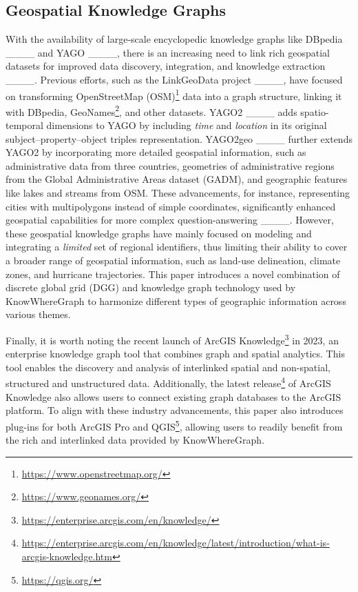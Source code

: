 \subsection{Geospatial Knowledge Graphs}
\label{ssec:gkg}
With the availability of large-scale encyclopedic knowledge graphs like DBpedia ____ and YAGO ____, there is an increasing need to link rich geospatial datasets for improved data discovery, integration, and knowledge extraction ____. Previous efforts, such as the LinkGeoData project ____, have focused on transforming OpenStreetMap (OSM)\footnote{\url{https://www.openstreetmap.org/}} data into a graph structure, linking it with DBpedia, GeoNames\footnote{\url{https://www.geonames.org/}}, and other datasets. YAGO2 ____ adds spatio-temporal dimensions to YAGO by including \emph{time} and \emph{location} in its original subject–property–object triples representation. YAGO2geo ____ further extends YAGO2 by incorporating more detailed geospatial information, such as administrative data from three countries, geometries of administrative regions from the Global Administrative Areas dataset (GADM), and geographic features like lakes and streams from OSM. These advancements, for instance, representing cities with multipolygons instead of simple coordinates, significantly enhanced geospatial capabilities for more complex question-answering ____. However, these geospatial knowledge graphs have mainly focused on modeling and integrating a \textit{limited} set of regional identifiers, thus limiting their ability to cover a broader range of geospatial information, such as land-use delineation, climate zones, and hurricane trajectories. This paper introduces a novel combination of discrete global grid (DGG) and knowledge graph technology used by KnowWhereGraph to harmonize different types of geographic information across various themes.

Finally, it is worth noting the recent launch of ArcGIS Knowledge\footnote{\url{https://enterprise.arcgis.com/en/knowledge/}} in 2023, an enterprise knowledge graph tool that combines graph and spatial analytics. This tool enables the discovery and analysis of interlinked spatial and non-spatial, structured and unstructured data. Additionally, the latest release\footnote{\url{https://enterprise.arcgis.com/en/knowledge/latest/introduction/what-is-arcgis-knowledge.htm}} of ArcGIS Knowledge also allows users to connect existing graph databases to the ArcGIS platform. To align with these industry advancements, this paper also introduces plug-ins for both ArcGIS Pro and QGIS\footnote{\url{https://qgis.org/}}, allowing users to readily benefit from the rich and interlinked data provided by KnowWhereGraph. 


